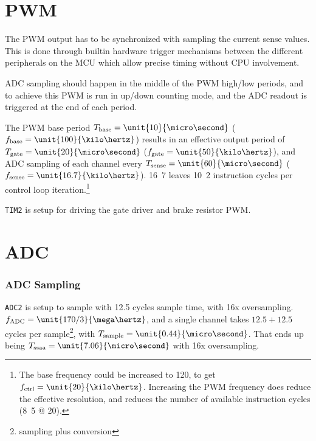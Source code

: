 \documentclass[12pt,a4paper,oneside,openany]{article}
\begin{document}


\section{PWM}

The PWM output has to be synchronized with sampling the current sense values. This is done through builtin hardware trigger mechanisms between the different peripherals on the MCU which allow precise timing without CPU involvement.

ADC sampling should happen in the middle of the PWM high/low periods, and to achieve this PWM is run in up/down counting mode, and the ADC readout is triggered at the end of each period.

The PWM base period $T_{\textrm{base}} = \unit{10}{\micro\second}$ ($f_{\textrm{base}} = \unit{100}{\kilo\hertz}$) results in an effective output period of $T_{\textrm{gate}} = \unit{20}{\micro\second}$ ($f_{\textrm{gate}} = \unit{50}{\kilo\hertz}$), and ADC sampling of each channel every $T_{\textrm{sense}} = \unit{60}{\micro\second}$ ($f_{\textrm{sense}} = \unit{16.7}{\kilo\hertz}$). \unit{16.7}{\kilo\hertz} leaves \unit{10.2}{\kilo} instruction cycles per control loop iteration.\footnote{The base frequency could be increased to \unit{120}{\kilo\hertz}, to get $f_{\textrm{ctrl}} = \unit{20}{\kilo\hertz}$. Increasing the PWM frequency does reduce the effective resolution, and reduces the number of available instruction cycles (\unit{8.5}{\kilo} @ \unit{20}{\kilo\hertz}).}

\texttt{TIM2} is setup for driving the gate driver and brake resistor PWM.

\section {ADC}

\subsubsection{ADC Sampling}

\texttt{ADC2} is setup to sample with 12.5 cycles sample time, with 16x oversampling. $f_{\textrm{ADC}} = \unit{170/3}{\mega\hertz}$, and a single channel takes $12.5+12.5$ cycles per sample\footnote{sampling plus conversion}, with $T_{\textrm{sample}} = \unit{0.44}{\micro\second}$. That ends up being $T_{\textrm{ssaa}} = \unit{7.06}{\micro\second}$ with 16x oversampling.
\end{document}
